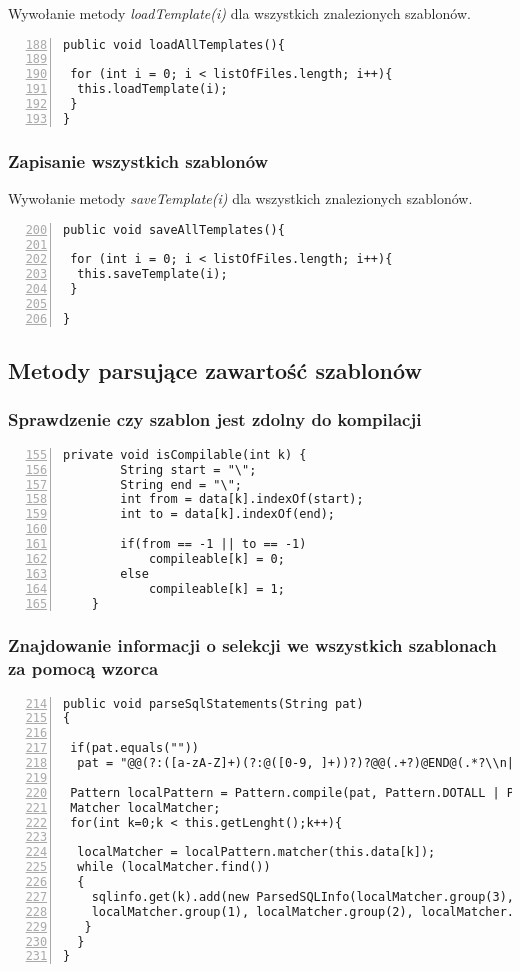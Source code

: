Wywołanie metody \emph{loadTemplate(i)} dla wszystkich znalezionych szablonów.

 \begin{lstlisting}[numbers=left,firstnumber=188]
public void loadAllTemplates(){
      
 for (int i = 0; i < listOfFiles.length; i++){
  this.loadTemplate(i);
 }
}
\end{lstlisting}

\subsubsection*{Zapisanie wszystkich szablonów}

Wywołanie metody \emph{saveTemplate(i)} dla wszystkich znalezionych szablonów.

 \begin{lstlisting}[numbers=left,firstnumber=200]
public void saveAllTemplates(){
      
 for (int i = 0; i < listOfFiles.length; i++){
  this.saveTemplate(i);
 }
       
}
\end{lstlisting}

\subsection{Metody parsujące zawartość szablonów}

\subsubsection*{Sprawdzenie czy szablon jest zdolny do kompilacji}
 \begin{lstlisting}[numbers=left,firstnumber=155]
    private void isCompilable(int k) {
        String start = "\";
        String end = "\";
        int from = data[k].indexOf(start);
        int to = data[k].indexOf(end);
        
        if(from == -1 || to == -1)
            compileable[k] = 0;
        else
            compileable[k] = 1;
    }
  \end{lstlisting}


\subsubsection*{Znajdowanie informacji o selekcji we wszystkich szablonach za pomocą wzorca}
 \begin{lstlisting}[numbers=left,firstnumber=214]
public void parseSqlStatements(String pat)
{

 if(pat.equals(""))
  pat = "@@(?:([a-zA-Z]+)(?:@([0-9, ]+))?)?@@(.+?)@END@(.*?\\n|.*)";
    
 Pattern localPattern = Pattern.compile(pat, Pattern.DOTALL | Pattern.MULTILINE);
 Matcher localMatcher;
 for(int k=0;k < this.getLenght();k++){

  localMatcher = localPattern.matcher(this.data[k]);
  while (localMatcher.find())
  {
    sqlinfo.get(k).add(new ParsedSQLInfo(localMatcher.group(3),
    localMatcher.group(1), localMatcher.group(2), localMatcher.end()));
   }
  }
}
  \end{lstlisting}

